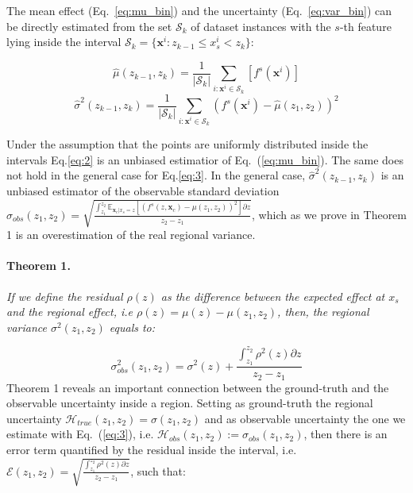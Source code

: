 \documentclass[twoside]{article}
\newcommand{\dfdx}{f^s}
\newcommand{\xc}{\mathbf{x}_c}
\begin{document}
The mean effect (Eq.~\eqref{eq:mu_bin}) and the
uncertainty (Eq.~\eqref{eq:var_bin}) can be directly estimated from
the set \(\mathcal{S}_k\) of dataset instances with the \(s\)-th
feature lying inside the interval
\( \mathcal{S}_k= \{ \mathbf{x}^i : z_{k-1} \leq x^i_s < z_k \} \):

\begin{equation}
  \label{eq:2}
  \hat{\mu}(z_{k-1}, z_k) = \frac{1}{|\mathcal{S}_k|}
  \sum_{i:\mathbf{x}^i \in \mathcal{S}_k} \left [ \dfdx(\mathbf{x}^i)
  \right ]
\end{equation}
%
\begin{equation}
  \label{eq:3}
  \hat{\sigma}^2(z_{k-1}, z_k) = \frac{1}{|\mathcal{S}_k|}
\sum_{i:\mathbf{x}^i \in \mathcal{S}_k} \left ( \dfdx(\mathbf{x}^i) -
  \hat{\mu}(z_1, z_2) \right )^2
\end{equation}

Under the assumption that the points are uniformly distributed inside
the intervals Eq.\eqref{eq:2} is an unbiased estimatior of
Eq.~(\ref{eq:mu_bin}). The same does not hold in the general case for
Eq.\eqref{eq:3}. In the general case, \(\hat{\sigma}^2(z_{k-1}, z_k)\)
is an unbiased estimator of the observable standard deviation
\(\sigma_{obs}(z_1, z_2) = \sqrt{\frac{\int_{z_1}^{z_2}
    \mathbb{E}_{\xc|x_s=z} \left [ (f^s(z, \xc) - \mu(z_1, z_2) )^2
    \right] \partial z}{z_2 - z_1}}\), which as we prove in Theorem 1
is an overestimation of the real regional variance.

\paragraph{Theorem 1.}
\label{sec:theorem-1}

\textit{If we define the residual \(\rho(z)\) as the difference
  between the expected effect at \(x_s\) and the regional effect, i.e
  \(\rho(z) = \mu(z) - \mu(z_1, z_2)\), then, the regional variance
  \(\sigma^2(z_1, z_2)\) equals to:}

\begin{equation}
    \label{eq:bin-uncertainty-proof}
 \sigma_{obs}^2(z_1, z_2) = \sigma^2(z) + \frac{\int_{z_1}^{z_2}\rho^2(z) \partial z}{z_2 - z_1}
\end{equation}
\noindent
Theorem 1 reveals an important connection between the ground-truth and
the observable uncertainty inside a region. Setting as ground-truth
the regional uncertainty
\(\mathcal{H}_{true}(z_1, z_2) = \sigma(z_1, z_2)\) and as observable
uncertainty the one we estimate with Eq.~(\ref{eq:3}), i.e.
\(\mathcal{H}_{obs}(z_1, z_2) := \sigma_{obs}(z_1, z_2)\), then there
is an error term quantified by the residual inside the interval, i.e.
\(\mathcal{E}(z_1, z_2) = \sqrt{\frac{\int_{z_1}^{z_2}\rho^2(z)
    \partial z}{z_2 - z_1}}\), such that:
\end{document}
